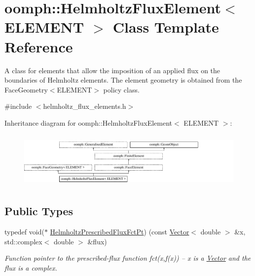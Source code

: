 \hypertarget{classoomph_1_1HelmholtzFluxElement}{}\section{oomph\+:\+:Helmholtz\+Flux\+Element$<$ E\+L\+E\+M\+E\+NT $>$ Class Template Reference}
\label{classoomph_1_1HelmholtzFluxElement}


A class for elements that allow the imposition of an applied flux on the boundaries of Helmholtz elements. The element geometry is obtained from the Face\+Geometry$<$\+E\+L\+E\+M\+E\+N\+T$>$ policy class.  




{\ttfamily \#include $<$helmholtz\+\_\+flux\+\_\+elements.\+h$>$}

Inheritance diagram for oomph\+:\+:Helmholtz\+Flux\+Element$<$ E\+L\+E\+M\+E\+NT $>$\+:\begin{figure}[H]
\begin{center}
\leavevmode
\includegraphics[height=2.796504cm]{classoomph_1_1HelmholtzFluxElement}
\end{center}
\end{figure}
\subsection*{Public Types}
\begin{DoxyCompactItemize}
\item 
typedef void($\ast$ \hyperlink{classoomph_1_1HelmholtzFluxElement_ad53ce405c551a39ac9baeaaab7f254df}{Helmholtz\+Prescribed\+Flux\+Fct\+Pt}) (const \hyperlink{classoomph_1_1Vector}{Vector}$<$ double $>$ \&x, std\+::complex$<$ double $>$ \&flux)
\begin{DoxyCompactList}\small\item\em Function pointer to the prescribed-\/flux function fct(x,f(x)) -- x is a \hyperlink{classoomph_1_1Vector}{Vector} and the flux is a complex. \end{DoxyCompactList}\end{DoxyCompactItemize}
